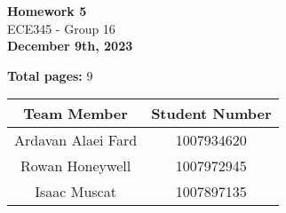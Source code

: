 \begin{titlepage}
    \begin{center}
    {\fontsize{40}{48}\selectfont \bfseries Homework 5} 
    \\\vspace{20pt}
    {\LARGE ECE345 - Group 16} \\
    \vspace{20pt}
    \textbf{December 9th, 2023}
    \vspace{8pt}

    \textbf{Total pages:} 9
    \end{center}

    \begin{table}[!ht]
        \centering
        \begin{tabular}{|c|c|}
        \hline
            \textbf{Team Member} & \textbf{Student Number} \\ \hline
            Ardavan Alaei Fard & 1007934620 \\ \hline
            Rowan Honeywell & 1007972945 \\ \hline
            Isaac Muscat & 1007897135 \\ \hline
        \end{tabular}
    \end{table}
\end{titlepage}